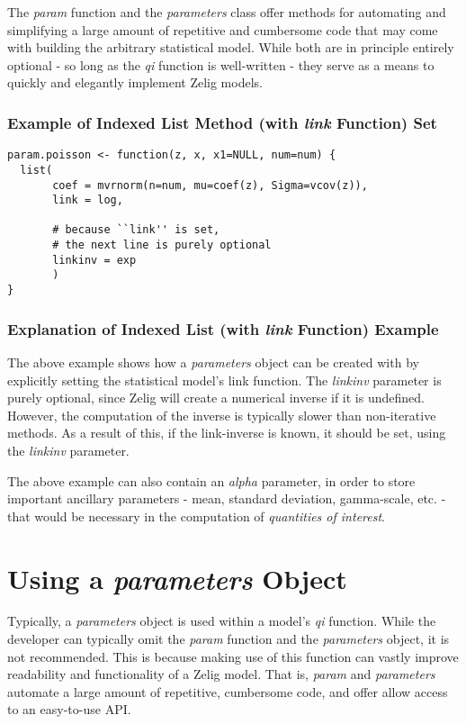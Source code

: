 \documentclass[a4paper,11pt]{article}
\begin{document}
The \emph{param} function and the \emph{parameters} class offer methods for automating and simplifying a large amount of repetitive and cumbersome code that may come with building the arbitrary statistical model.  While both are in principle entirely optional - so long as the \emph{qi} function is well-written - they serve as a means to quickly and elegantly implement Zelig models.


\subsubsection{Example of Indexed List Method (with \emph{link} Function) Set}

\begin{verbatim}
param.poisson <- function(z, x, x1=NULL, num=num) {
  list(
       coef = mvrnorm(n=num, mu=coef(z), Sigma=vcov(z)),
       link = log,
             
       # because ``link'' is set,
       # the next line is purely optional
       linkinv = exp
       )
}
\end{verbatim}

\subsubsection{Explanation of Indexed List (with \emph{link} Function) Example}

The above example shows how a \emph{parameters} object can be created with by explicitly setting the statistical model's link function.  The \emph{linkinv} parameter is purely optional, since Zelig will create a numerical inverse if it is undefined.  However, the computation of the inverse is typically slower than non-iterative methods.  As a result of this, if the link-inverse is known, it should be set, using the \emph{linkinv} parameter.

The above example can also contain an \emph{alpha} parameter, in order to store important ancillary parameters - mean, standard deviation, gamma-scale, etc. - that would be necessary in the computation of \emph{quantities of interest}.


%
\section{Using a \emph{parameters} Object}

Typically, a \emph{parameters} object is used within a model's \emph{qi} function.  While the developer can typically omit the \emph{param} function and the \emph{parameters} object, it is not recommended.  This is because making use of this function can vastly improve readability and functionality of a Zelig model.  That is, \emph{param} and \emph{parameters} automate a large amount of repetitive, cumbersome code, and offer allow access to an easy-to-use API.
\end{document}
